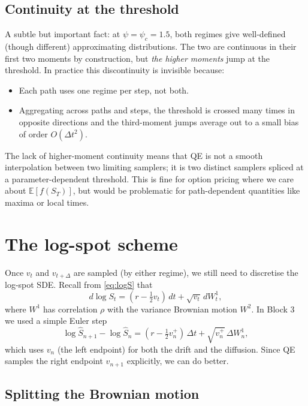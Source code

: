\documentclass[11pt]{article}
\theoremstyle{plain}
\theoremstyle{definition}
\theoremstyle{remark}
\begin{document}
\subsection{Continuity at the threshold}

A subtle but important fact: at $\psi = \psi_c = 1.5$, both regimes give well-defined (though different) approximating distributions. The two are continuous in their first two moments by construction, but \emph{the higher moments} jump at the threshold. In practice this discontinuity is invisible because:
\begin{itemize}[topsep=2pt]
    \item Each path uses one regime per step, not both.
    \item Aggregating across paths and steps, the threshold is crossed many times in opposite directions and the third-moment jumps average out to a small bias of order $O(\Delta t^2)$.
\end{itemize}
The lack of higher-moment continuity means that QE is not a smooth interpolation between two limiting samplers; it is two distinct samplers spliced at a parameter-dependent threshold. This is fine for option pricing where we care about $\mathbb{E}[f(S_T)]$, but would be problematic for path-dependent quantities like maxima or local times.

\section{The log-spot scheme}

Once $v_t$ and $v_{t+\Delta}$ are sampled (by either regime), we still need to discretise the log-spot SDE. Recall from \eqref{eq:logS} that
\[
    d \log S_t = (r - \tfrac12 v_t)\, dt + \sqrt{v_t}\, dW^1_t,
\]
where $W^1$ has correlation $\rho$ with the variance Brownian motion $W^2$. In Block 3 we used a simple Euler step
\[
    \log \hat S_{n+1} - \log \hat S_n = (r - \tfrac12 v_n^+)\, \Delta t + \sqrt{v_n^+}\,\Delta W^1_n,
\]
which uses $v_n$ (the left endpoint) for both the drift and the diffusion. Since QE samples the right endpoint $v_{n+1}$ explicitly, we can do better.

\subsection{Splitting the Brownian motion}
\end{document}
